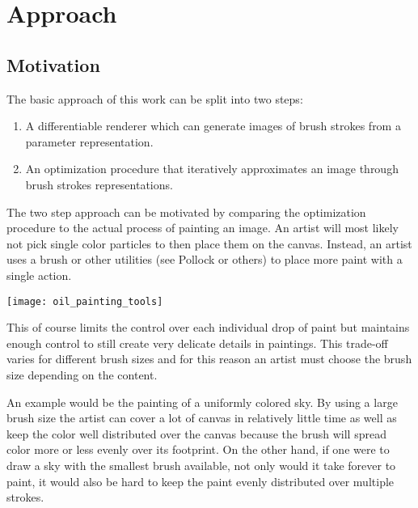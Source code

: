 \setchapterpreamble[u]{\margintoc}
\chapter{Approach}


\section{Motivation}


The basic approach of this work can be split into two steps:
\begin{enumerate}
    \item A differentiable renderer which can generate images of brush strokes from a parameter representation.
    \item An optimization procedure that iteratively approximates an image through brush strokes representations.
\end{enumerate}

The two step approach can be motivated by comparing the optimization procedure to the
actual process of painting an image.
An artist will most likely not pick single color particles to then place them on
the canvas.
Instead, an artist uses a brush or other utilities (see Pollock or others) to place
more paint with a single action.

\begin{marginfigure}
    \texttt{[image: oil\_painting\_tools]}
    \caption[]{A typical set of brushes and spatulas used for oil paintings.
    }
\end{marginfigure}

This of course limits the control over each individual drop of paint but maintains
enough control to still create very delicate details in paintings.
This trade-off varies for different brush sizes and for this reason an artist must
choose the brush size depending on the content.

An example would be the painting of a uniformly colored sky.
By using a large brush size the artist can cover a lot of canvas in relatively little
time as well as keep the color well distributed over the canvas because the brush
will spread color more or less evenly over its footprint.
On the other hand, if one were to draw a sky with the smallest brush available,
not only would it take forever to paint, it would also be hard to keep the paint
evenly distributed over multiple strokes.

